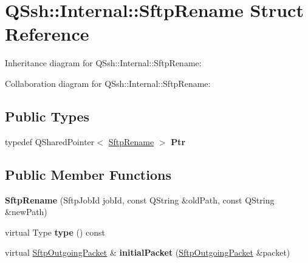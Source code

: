 \hypertarget{struct_q_ssh_1_1_internal_1_1_sftp_rename}{}\section{Q\+Ssh\+:\+:Internal\+:\+:Sftp\+Rename Struct Reference}
\label{struct_q_ssh_1_1_internal_1_1_sftp_rename}


Inheritance diagram for Q\+Ssh\+:\+:Internal\+:\+:Sftp\+Rename\+:


Collaboration diagram for Q\+Ssh\+:\+:Internal\+:\+:Sftp\+Rename\+:
\subsection*{Public Types}
\begin{DoxyCompactItemize}
\item 
\mbox{\label{struct_q_ssh_1_1_internal_1_1_sftp_rename_a2672fbd174ef0315c95ff29e3d6747af}} 
typedef Q\+Shared\+Pointer$<$ \mbox{\hyperlink{struct_q_ssh_1_1_internal_1_1_sftp_rename}{Sftp\+Rename}} $>$ {\bfseries Ptr}
\end{DoxyCompactItemize}
\subsection*{Public Member Functions}
\begin{DoxyCompactItemize}
\item 
\mbox{\label{struct_q_ssh_1_1_internal_1_1_sftp_rename_a6e40e699665ff3c57fc7bfa18fe69f18}} 
{\bfseries Sftp\+Rename} (Sftp\+Job\+Id job\+Id, const Q\+String \&old\+Path, const Q\+String \&new\+Path)
\item 
\mbox{\label{struct_q_ssh_1_1_internal_1_1_sftp_rename_aeff121d1b9f285d91c74652fa150917d}} 
virtual Type {\bfseries type} () const
\item 
\mbox{\label{struct_q_ssh_1_1_internal_1_1_sftp_rename_a0241992bea37ed1fb3136ce6a34e30ef}} 
virtual \mbox{\hyperlink{class_q_ssh_1_1_internal_1_1_sftp_outgoing_packet}{Sftp\+Outgoing\+Packet}} \& {\bfseries initial\+Packet} (\mbox{\hyperlink{class_q_ssh_1_1_internal_1_1_sftp_outgoing_packet}{Sftp\+Outgoing\+Packet}} \&packet)
\end{DoxyCompactItemize}
